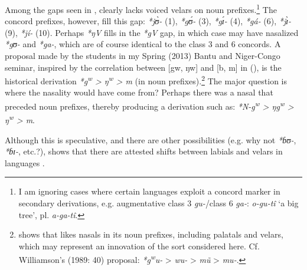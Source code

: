 \documentclass[output=paper]{langsci/langscibook}
\begin{document}
Among the gaps seen in ,  clearly lacks voiced velars on noun prefixes.\footnote{I am ignoring cases where certain  languages exploit a concord marker in secondary derivations, e.g.  augmentative class 3 \textit{gu-}/class 6 \textit{ga-}: \textit{o-gu-tî} ‘a big tree’, pl. \textit{a-ga-tî}.} The concord prefixes, however, fill this gap: \textit{*jʊ̀-} (1), \textit{*gʊ́-} (3), \textit{*gɪ́-} (4), \textit{*gá-} (6), \textit{*jɪ̀-} (9), \textit{*jí-} (10). Perhaps  \textit{*ŋV }fills in the \textit{*gV} gap, in which case  may have nasalized  \textit{*gʊ-} and \textit{*ga-}, which are of course identical to the  class 3 and 6 concords. A proposal made by the students in my  Spring (2013) Bantu and Niger-Congo seminar, inspired by the correlation between [gw, ŋw] and [b, m] in  (), is the historical derivation  \textit{*g\textsuperscript{w} > ŋ\textsuperscript{w} > m} (in  noun prefixes).\footnote{ shows that  likes nasals in its noun prefixes, including palatals and velars, which may represent an innovation of the sort considered here. Cf. Williamson’s (1989: 40) proposal: \textit{*g\textsuperscript{w}}\textit{u-} > \textit{wu-} > \textit{mũ} > \textit{mu-}.} The major question is where the nasality would have come from? Perhaps there was a nasal that  preceded  noun prefixes, thereby producing a derivation such as: \textit{*N-g\textsuperscript{w} > ŋg\textsuperscript{w} > ŋ\textsuperscript{w} > m}.

Although this is speculative, and there are other possibilities (e.g. why not \mbox{\textit{*ɓʊ-},} \textit{*ɓɪ-}, etc.?),  shows that there are attested shifts between labials and velars in  languages \citep[200]{Hyman1980nasalclasses}.
\end{document}
